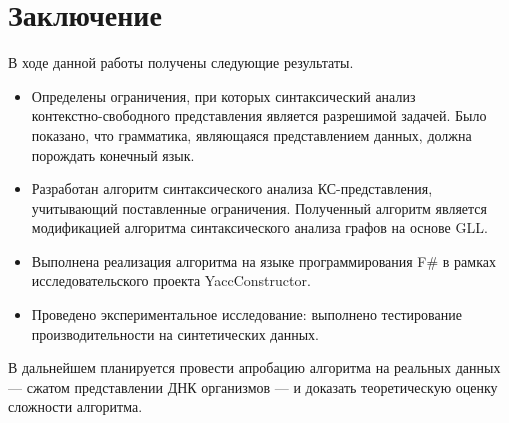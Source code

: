 \section*{Заключение}

В ходе данной работы получены следующие результаты.

\begin{itemize}
	\item Определены ограничения, при которых синтаксический анализ \\ контекстно-свободного представления является разрешимой задачей. Было показано, что грамматика, являющаяся представлением данных, должна порождать конечный язык.
	\item Разработан алгоритм синтаксического анализа КС-представления, учитывающий поставленные ограничения. Полученный алгоритм является модификацией алгоритма синтаксического анализа графов на основе GLL.
	\item Выполнена реализация алгоритма на языке программирования F$\#$ в рамках исследовательского проекта YaccConstructor.
	\item Проведено экспериментальное исследование: выполнено тестирование производительности на синтетических данных.
\end{itemize}  

В дальнейшем планируется провести апробацию алгоритма на реальных данных --- сжатом представлении ДНК организмов --- и доказать теоретическую оценку сложности алгоритма.